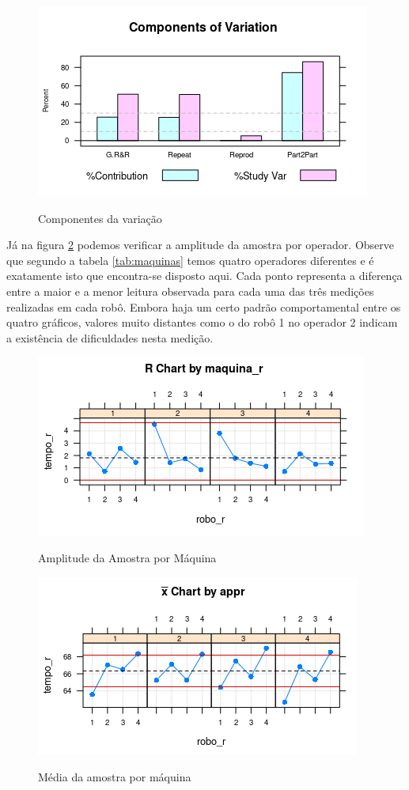 \documentclass[
12pt,					%
openright,				%
oneside,				%
a4paper,				%
english,
brazil
]{ABNT/abntex2_report}
\begin{document}
\begin{figure}[H]
    \centering
    \caption{Componentes da variação}
    \includegraphics[scale = 1]{figures/graf1.png}
    \label{fig:compvar}

\end{figure}


Já na figura \ref{fig:r_maquina} podemos verificar a amplitude da amostra por operador. Observe que segundo a tabela \ref{tab:maquinas} temos quatro operadores diferentes e é exatamente isto que encontra-se disposto aqui. Cada ponto representa a diferença entre a maior e a menor leitura observada para cada uma das três medições realizadas em cada robô. Embora haja um certo padrão comportamental entre os quatro gráficos, valores muito distantes como o do robô 1 no operador 2 indicam a existência de dificuldades nesta medição. 
\begin{figure}[H]
	\caption{Amplitude da Amostra por Máquina}
	\includegraphics[]{figures/graf3.png}
	\label{fig:r_maquina}
\end{figure}


\begin{figure}[H]
	\centering
	\caption{Média da amostra por máquina}
	\includegraphics[scale = 1]{figures/graf5.png}
	\label{fig:graf5}
\end{figure}
\end{document}
